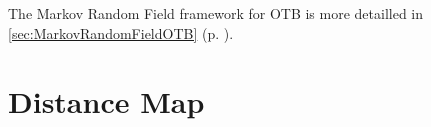 The Markov Random Field framework for OTB is more detailled in \ref{sec:MarkovRandomFieldOTB} (p. \pageref{sec:MarkovRandomFieldOTB}).

\ifitkFullVersion

\fi

\section{Distance Map}
\label{sec:DistanceMap}

\ifitkFullVersion

\fi




%










